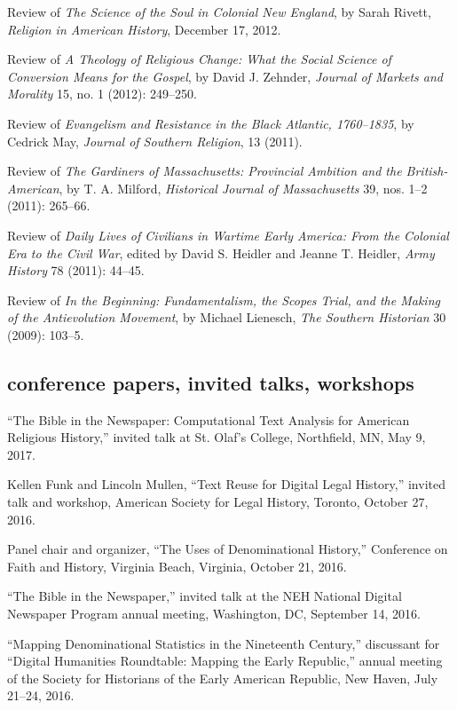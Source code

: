 \documentclass[11pt]{article}
\begin{document}
Review of \emph{The Science of the Soul in Colonial New England}, by
Sarah Rivett, \emph{Religion in American History}, December 17, 2012.

Review of \emph{A Theology of Religious Change: What the Social Science
  of Conversion Means for the Gospel}, by David J. Zehnder, \emph{Journal
  of Markets and Morality} 15, no. 1 (2012): 249--250.

Review of \emph{Evangelism and Resistance in the Black Atlantic,
  1760--1835}, by Cedrick May, \emph{Journal of Southern Religion}, 13
(2011).

Review of \emph{The Gardiners of Massachusetts: Provincial Ambition and
  the British-American}, by T. A. Milford, \emph{Historical Journal of
  Massachusetts} 39, nos. 1--2 (2011): 265--66.

Review of \emph{Daily Lives of Civilians in Wartime Early America: From
  the Colonial Era to the Civil War}, edited by David S. Heidler and
Jeanne T. Heidler, \emph{Army History} 78 (2011): 44--45.

Review of \emph{In the Beginning: Fundamentalism, the Scopes Trial, and
  the Making of the Antievolution Movement}, by Michael Lienesch,
\emph{The Southern Historian} 30 (2009): 103--5.

\subsection{conference papers, invited 
  talks, workshops}\label{conference-papers-invited-talks}

``The Bible in the Newspaper: Computational Text Analysis for American 
Religious History,'' invited talk at St. Olaf's College, Northfield, MN, May 
9, 2017.


Kellen Funk and Lincoln Mullen, ``Text Reuse for Digital Legal History,'' 
invited talk and workshop, American Society for Legal History, Toronto, October 27, 2016.

Panel chair and organizer, ``The Uses of Denominational History,'' Conference 
on Faith and History, Virginia Beach, Virginia, October 21, 2016.

``The Bible in the Newspaper,'' invited talk at the NEH National Digital 
Newspaper Program annual meeting, Washington, DC, September 14, 2016.

``Mapping Denominational Statistics in the Nineteenth Century,'' discussant 
for ``Digital Humanities Roundtable: Mapping the Early Republic,'' annual 
meeting of the Society for Historians of the Early American Republic, New 
Haven, July 21--24, 2016.
\end{document}
